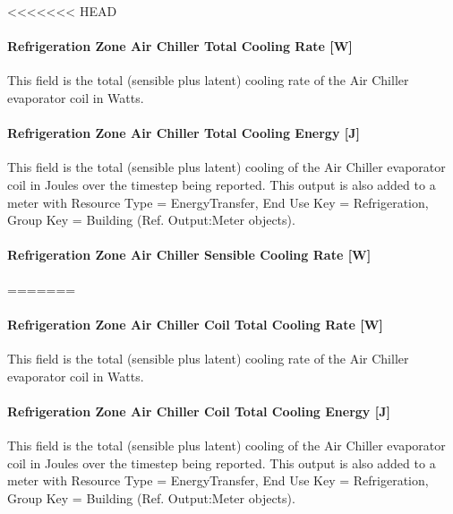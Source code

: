 <<<<<<< HEAD
\paragraph{Refrigeration Zone Air Chiller Total Cooling Rate {[}W{]}}\label{refrigeration-zone-air-chiller-total-cooling-rate-w-1}

This field is the total (sensible plus latent) cooling rate of the Air Chiller evaporator coil in Watts.

\paragraph{Refrigeration Zone Air Chiller Total Cooling Energy {[}J{]}}\label{refrigeration-zone-air-chiller-total-cooling-energy-j}

This field is the total (sensible plus latent) cooling of the Air Chiller evaporator coil in Joules over the timestep being reported. This output is also added to a meter with Resource Type = EnergyTransfer, End Use Key = Refrigeration, Group Key = Building (Ref. Output:Meter objects).

\paragraph{Refrigeration Zone Air Chiller Sensible Cooling Rate {[}W{]}}\label{refrigeration-zone-air-chiller-sensible-cooling-rate-w-1}
=======
\paragraph{Refrigeration Zone Air Chiller Coil Total Cooling Rate {[}W{]}}\label{refrigeration-zone-air-chiller-coil-total-cooling-rate-w-1}

This field is the total (sensible plus latent) cooling rate of the Air Chiller evaporator coil in Watts.

\paragraph{Refrigeration Zone Air Chiller Coil Total Cooling Energy {[}J{]}}\label{refrigeration-zone-air-chiller-coil-total-cooling-energy-j}

This field is the total (sensible plus latent) cooling of the Air Chiller evaporator coil in Joules over the timestep being reported. This output is also added to a meter with Resource Type = EnergyTransfer, End Use Key = Refrigeration, Group Key = Building (Ref. Output:Meter objects).

